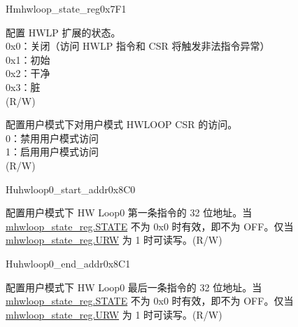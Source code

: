 \begin{register}{H}{mhwloop\_state\_reg}{0x7F1}\label{regdesc:mhwlp_state_reg}
%
%
%
\regnewline%
\begin{regdesc}\begin{reglist}
\label{fielddesc:HWSTATE}\item [STATE] 配置 HWLP 扩展的状态。\\
0x0：关闭（访问 HWLP 指令和 CSR 将触发非法指令异常）\\
0x1：初始\\
0x2：干净\\
0x3：脏\\
(R/W)
\label{fielddesc:URW}\item [URW] 配置用户模式下对用户模式 HWLOOP CSR 的访问。\\
0：禁用用户模式访问\\
1：启用用户模式访问\\
(R/W)
\end{reglist}\end{regdesc}
\end{register}

\begin{register}{H}{uhwloop0\_start\_addr}{0x8C0}\label{regdesc:uhloop0_start_addr}
%
\regnewline%
\begin{regdesc}\begin{reglist}
\label{fielddesc:UHWLP0_SA}\item [SA] 配置用户模式下 HW Loop0 第一条指令的 32 位地址。当 \hyperref[fielddesc:HWSTATE]{mhwloop\_state\_reg.STATE} 不为 0x0 时有效，即不为 OFF。仅当 \hyperref[fielddesc:HWSTATE]{mhwloop\_state\_reg.URW} 为 1 时可读写。(R/W)
\end{reglist}\end{regdesc}
\end{register}

\begin{register}{H}{uhwloop0\_end\_addr}{0x8C1}\label{regdesc:uhloop0_end_addr}
%
\regnewline%
\begin{regdesc}\begin{reglist}
\label{fielddesc:UHWLP0_EA}\item [EA] 配置用户模式下 HW Loop0 最后一条指令的 32 位地址。当 \hyperref[fielddesc:HWSTATE]{mhwloop\_state\_reg.STATE} 不为 0x0 时有效，即不为 OFF。仅当 \hyperref[fielddesc:HWSTATE]{mhwloop\_state\_reg.URW} 为 1 时可读写。(R/W)
\end{reglist}\end{regdesc}
\end{register}

